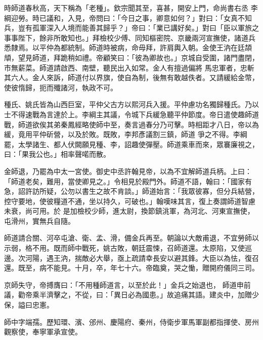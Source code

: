 \begin{pinyinscope}
 時師道春秋高，天下稱為「老種」。欽宗聞其至，喜甚，開安上門，命尚書右丞
 李綱迎勞。時已議和，入見，帝問曰：「今日之事，卿意如何？」對曰：「女真不知兵，豈有孤軍深入人境而能善其歸乎？」帝曰：「業已講好矣。」對曰「臣以軍旅之事事陛下，餘非所敢知也。」拜檢校少傅、同知樞密院、京畿兩河宣撫使，諸道兵悉隸焉。以平仲為都統制。師道時被病，命毋拜，許肩輿入朝。金使王汭在廷頡頏，望見師道，拜跪稍如禮。帝顧笑曰：「彼為卿故也。」京城自受圍，諸門盡閉，市無薪菜。師道請啟西、南壁，聽民出入如常。金人有擅過偏將
 馬忠軍者，忠斬其六人。金人來訴，師道付以界旗，使自為制，後無有敢越佚者。又請緩給金幣，使彼惰歸，扼而殲諸河，執政不可。



 種氏、姚氏皆為山西巨室，平仲父古方以熙河兵入援。平仲慮功名獨歸種氏。乃以士不得速戰為言達於上。李綱主其議，令城下兵緩急聽平仲節度。帝日遣使趣師道戰，師道欲俟其弟秦鳳經略使師中至，奏言過春分乃可擊。時相距才八日，帝以為緩，竟用平仲斫營，以及於敗。既敗，李邦彥議割三鎮，師道
 爭之不得。李綱罷，太學諸生、都人伏闕願見種、李，詔趣使彈壓。師道乘車而來，眾褰廉視之，曰：「果我公也。」相率聲喏而散。



 金師退，乃罷為中太一宮使。御史中丞許翰見帝，以為不宜解師道兵柄。上曰：「師道老矣，難用，當使卿見之。」令相見於殿門外。師道不語，翰曰：「國家有急，詔許訪所疑，公勿以書生之故不肯談。」師道始言：「我眾彼寡，但分兵結營，控守要地，使彼糧道不通，坐以持久，可破也。」翰嘆味其言，復上奏謂師道智慮未衰，尚可用。於
 是加檢校少師，進太尉，換節鎮洮軍，為河北、河東宣撫使，屯滑州，實無兵自隨。



 師道請合關、河卒屯滄、衛、孟、滑，備金兵再至。朝論以大敵甫退，不宜勞師以示弱，格不用。既而師中戰死，姚古敗，朝廷震悚，召師道還。太原陷，又使巡邊。次河陽，遇王汭，揣敵必大舉，亟上疏請幸長安以避其鋒。大臣以為怯，復召還。既至，病不能見。十月，卒，年七十六。帝臨奠，哭之慟，贈開府儀同三司。



 京師失守，帝搏膺曰：「不用種師道言，以至於此！」金兵之始退也，
 師道申前議，勸帝乘半濟擊之，不從，曰：「異日必為國患。」故追痛其語。建炎中，加贈少保，謚曰忠憲。



 師中字端孺。歷知環、濱、邠州、慶陽府、秦州，侍衛步軍馬軍副都指揮使、房州觀察使，奉寧軍承宣使。




\end{pinyinscope}
